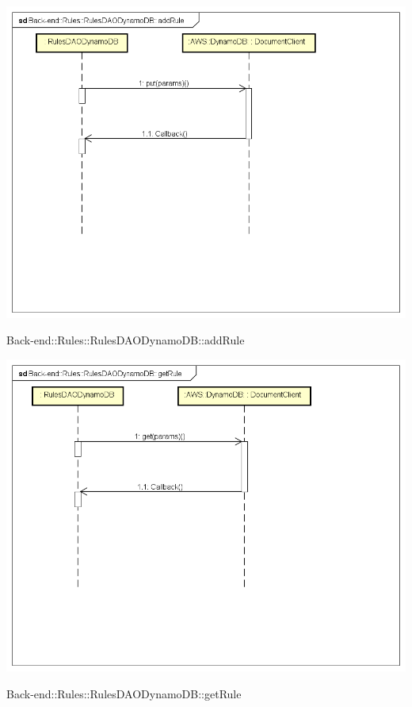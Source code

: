 \includegraphics[width=\textwidth,height=\textheight,keepaspectratio]{images/diagrams/back-end/Ufficial_Backend/Back-end__Rules__RulesDAODynamoDB__addRule.png} 	\caption{Back-end::Rules::RulesDAODynamoDB::addRule}
\includegraphics[width=\textwidth,height=\textheight,keepaspectratio]{images/diagrams/back-end/Ufficial_Backend/Back-end__Rules__RulesDAODynamoDB__getRule.png} 	\caption{Back-end::Rules::RulesDAODynamoDB::getRule}
